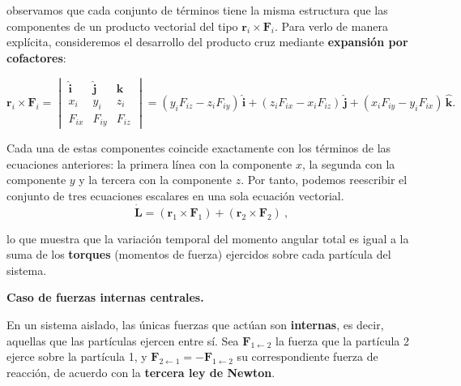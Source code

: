 \documentclass{article}
\begin{document}
observamos que cada conjunto de términos tiene la misma estructura que las componentes de un producto vectorial del tipo \(\boldsymbol{r}_i\times\boldsymbol{F}_i\).  
Para verlo de manera explícita, consideremos el desarrollo del producto cruz mediante \textcolor{orange(colorwheel)}{\textbf{expansión por cofactores}}:

\[
\boldsymbol{r}_i\times\boldsymbol{F}_i =
\begin{vmatrix}
\hat{\boldsymbol{i}} & \hat{\boldsymbol{j}} & \hat{\boldsymbol{k}}\\
x_i & y_i & z_i\\
F_{ix} & F_{iy} & F_{iz}
\end{vmatrix}
= (y_iF_{iz}-z_iF_{iy})\,\hat{\boldsymbol{i}}
+ (z_iF_{ix}-x_iF_{iz})\,\hat{\boldsymbol{j}}
+ (x_iF_{iy}-y_iF_{ix})\,\hat{\boldsymbol{k}}.
\]

Cada una de estas componentes coincide exactamente con los términos de las ecuaciones anteriores:  
la primera línea con la componente \(x\), la segunda con la componente \(y\) y la tercera con la componente \(z\).  
Por tanto, podemos reescribir el conjunto de tres ecuaciones escalares en una sola ecuación vectorial.
\[
\boxed{\ \dot{\boldsymbol{L}} = (\boldsymbol{r}_1\times\boldsymbol{F}_1) + (\boldsymbol{r}_2\times\boldsymbol{F}_2)\ }\!,
\]

lo que muestra que la variación temporal del momento angular total es igual a la suma de los \textbf{torques} (momentos de fuerza) ejercidos sobre cada partícula del sistema.



\textcolor{trueblue}{\textbf{Caso de fuerzas internas centrales.}}

En un sistema aislado, las únicas fuerzas que actúan son \textbf{internas}, es decir, aquellas que las partículas ejercen entre sí.  
Sea \(\boldsymbol{F}_{1\leftarrow 2}\) la fuerza que la partícula 2 ejerce sobre la partícula 1, y \(\boldsymbol{F}_{2\leftarrow 1}=-\boldsymbol{F}_{1\leftarrow 2}\) su correspondiente fuerza de reacción, de acuerdo con la \textbf{tercera ley de Newton}.  
\end{document}
